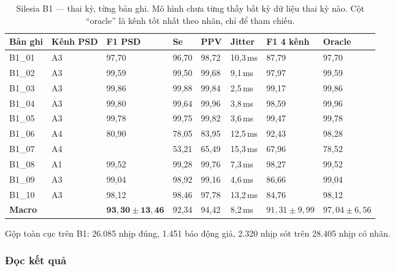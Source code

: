 \begin{table}[H]\centering\small
\caption{Silesia B1 --- thai kỳ, từng bản ghi. Mô hình chưa từng thấy bất kỳ dữ liệu thai kỳ nào.
Cột ``oracle'' là kênh tốt nhất theo nhãn, chỉ để tham chiếu.}
\label{tab:silesiaB1}
\begin{tabular}{@{}C{1.3cm} C{1.3cm} C{1.5cm} C{1.4cm} C{1.4cm} C{1.6cm} C{1.6cm} C{1.5cm}@{}}
\toprule
\textbf{Bản ghi} & \textbf{Kênh PSD} & \textbf{F1 PSD} & \textbf{Se} & \textbf{PPV} & \textbf{Jitter} &
\textbf{F1 4 kênh} & \textbf{Oracle} \\
\midrule
B1\_01 & A3 & 97,70 & 96,70 & 98,72 & 10,3\,ms & 87,79 & 97,70 \\
B1\_02 & A3 & 99,59 & 99,50 & 99,68 & 9,1\,ms & 97,97 & 99,59 \\
B1\_03 & A3 & 99,86 & 99,88 & 99,84 & 2,5\,ms & 99,17 & 99,86 \\
B1\_04 & A3 & 99,80 & 99,64 & 99,96 & 3,8\,ms & 98,59 & 99,96 \\
B1\_05 & A3 & 99,78 & 99,75 & 99,82 & 3,6\,ms & 99,47 & 99,78 \\
B1\_06 & A4 & 80,90 & 78,05 & 83,95 & 12,5\,ms & 92,43 & 98,28 \\
B1\_07 & A4 &  & 53,21 & 65,49 & 15,3\,ms & 67,96 & 78,52 \\
B1\_08 & A1 & 99,52 & 99,28 & 99,76 & 7,3\,ms & 98,27 & 99,52 \\
B1\_09 & A3 & 99,04 & 98,92 & 99,16 & 4,6\,ms & 86,66 & 99,04 \\
B1\_10 & A3 & 98,12 & 98,46 & 97,78 & 13,2\,ms & 84,76 & 98,12 \\
\midrule
\textbf{Macro} & & $\mathbf{93{,}30 \pm 13{,}46}$ & 92,34 & 94,42 & 8,2\,ms & $91{,}31 \pm 9{,}99$ & $97{,}04 \pm 6{,}56$ \\
\bottomrule
\end{tabular}
\end{table}

Gộp toàn cục trên B1: 26.085 nhịp đúng, 1.451 báo động giả, 2.320 nhịp sót trên 28.405 nhịp có nhãn.

\subsubsection{Đọc kết quả}

